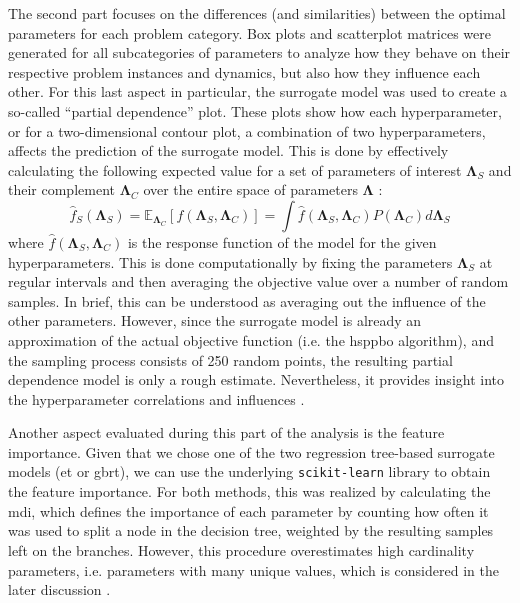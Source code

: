 The second part focuses on the differences (and similarities) between the optimal parameters for each problem category. Box plots and scatterplot matrices were generated for all subcategories of parameters to analyze how they behave on their respective problem instances and dynamics, but also how they influence each other. For this last aspect in particular, the surrogate model was used to create a so-called \enquote{partial dependence} plot. These plots show how each hyperparameter, or for a two-dimensional contour plot, a combination of two hyperparameters, affects the prediction of the surrogate model. This is done by effectively calculating the following expected value for a set of parameters of interest $\mathbf{\Lambda}_S$ and their complement $\mathbf{\Lambda}_C$ over the entire space of parameters $\mathbf{\Lambda}$ \cite[Chapter~10.13.2]{hastie2009elements}:
\begin{equation}
	\hat{f}_S (\mathbf{\Lambda}_S) = \mathbb{E}_{\mathbf{\Lambda}_C} \left[ f(\mathbf{\Lambda}_S,\mathbf{\Lambda}_C)\right] = \int \hat{f}(\mathbf{\Lambda}_S,\mathbf{\Lambda}_C) P(\mathbf{\Lambda}_C) d\mathbf{\Lambda}_S
\end{equation}
where $\hat{f}(\mathbf{\Lambda}_S,\mathbf{\Lambda}_C)$ is the response function of the model for the given hyperparameters. This is done computationally by fixing the parameters $\mathbf{\Lambda}_S$ at regular intervals and then averaging the objective value over a number of random samples. In brief, this can be understood as averaging out the influence of the other parameters. However, since the surrogate model is already an approximation of the actual objective function (i.e. the \gls{hsppbo} algorithm), and the sampling process consists of 250 random points, the resulting partial dependence model is only a rough estimate. Nevertheless, it provides insight into the hyperparameter correlations and influences \cite{friedman2001greedy}.

Another aspect evaluated during this part of the analysis is the feature importance. Given that we chose one of the two regression tree-based surrogate models (\gls{et} or \gls{gbrt}), we can use the underlying \texttt{scikit-learn} library to obtain the feature importance. For both methods, this was realized by calculating the \gls{mdi}, which defines the importance of each parameter by counting how often it was used to split a node in the decision tree, weighted by the resulting samples left on the branches. However, this procedure overestimates high cardinality parameters, i.e. parameters with many unique values, which is considered in the later discussion \cite{strobl2007bias}.

